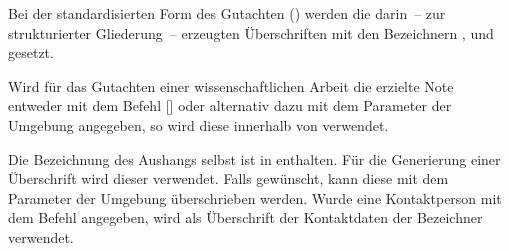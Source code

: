 \begin{Bundle*}{}
\begin{Declaration}{}
\begin{Declaration}{}
\printdeclarationlist%
%
Bei der standardisierten Form des Gutachten () werden die 
darin~-- zur strukturierter Gliederung~-- erzeugten Überschriften mit den 
Bezeichnern ,  und  
gesetzt.
\end{Declaration}
\end{Declaration}

\begin{Declaration}{}
\printdeclarationlist%
%
Wird für das Gutachten einer wissenschaftlichen Arbeit die erzielte Note 
entweder mit dem Befehl [] oder alternativ dazu 
mit dem Parameter  der 
Umgebung  angegeben, so wird diese innerhalb von 
 verwendet.
\end{Declaration}

\begin{Declaration}{}
\begin{Declaration}[v2.02]{}
\printdeclarationlist%
%
Die Bezeichnung des Aushangs selbst ist in  enthalten. Für 
die Generierung einer Überschrift wird dieser verwendet. Falls gewünscht, kann 
diese mit dem Parameter  der Umgebung 
 überschrieben werden. Wurde eine Kontaktperson mit dem 
Befehl  angegeben, wird als Überschrift der Kontaktdaten 
der Bezeichner  verwendet.

\end{Declaration}
\end{Declaration}
%
\end{Bundle*}

